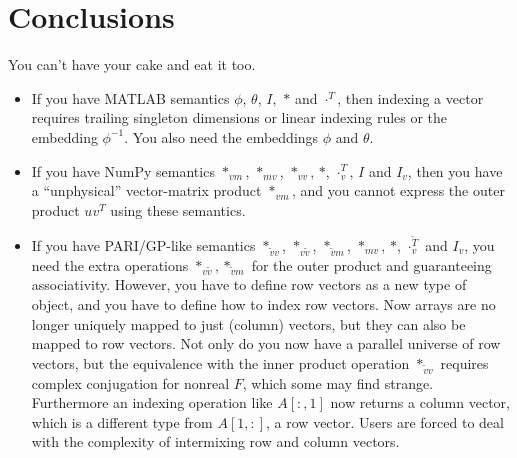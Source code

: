 \section{Conclusions}

You can't have your cake and eat it too.
\begin{itemize}
\item If you have MATLAB semantics $\phi$, $\theta$, $I,$ $*$ and $\cdot^{T}$,
then indexing a vector requires trailing singleton dimensions or linear
indexing rules or the embedding $\phi^{-1}$. You also need the embeddings
$\phi$ and $\theta$.
\item If you have NumPy semantics $*_{vm}$, $*_{mv}$, $*_{vv}$, $*$,
$\cdot_{v}^{T}$, $I$ and $I_{v}$, then you have a ``unphysical''
vector-matrix product $*_{vm}$, and you cannot express the outer
product $uv^{T}$ using these semantics.
\item If you have PARI/GP-like semantics $*_{\tilde{v}v}$, $*_{v\tilde{v}}$,
$*_{\tilde{v}m}$, $*_{mv}$, $*$, $\cdot_{v}^{\tilde{T}}$ and $I_{v}$,
you need the extra operations $*_{v\tilde{v}},*_{\tilde{v}m}$ for
the outer product and guaranteeing associativity. However, you have
to define row vectors as a new type of object, and you have to define
 how to index row vectors. Now arrays are no longer uniquely mapped
to just (column) vectors, but they can also be mapped to row vectors.
Not only do you now have a parallel universe of row vectors, but the
equivalence with the inner product operation $*_{\tilde{v}v}$ requires
complex conjugation for nonreal $F$, which some may find strange.
Furthermore an indexing operation like $A[:,1]$ now returns a column
vector, which is a different type from $A[1,:]$, a row vector. Users
are forced to deal with the complexity of intermixing row and column
vectors.
\end{itemize}
